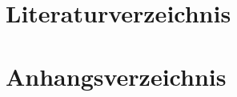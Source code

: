 \documentclass[
pagesize,				%
a4paper,				%
oneside,				%
headsepline,		    %
11pt,					%
halfparskip,		    %
final,					%
listof=totoc           %
]{scrartcl}			    %
\begin{document}




\newpage
\renewcommand{\thesection}{\roman{section}}
\ohead[\pagemark]{}
\setcounter{section}{0}
\newpage
\section{Literaturverzeichnis}
\label{sec:literaturverzeichnis}
\printbibliography
\newpage
\section{Anhangsverzeichnis}
\label{sec:anhangsverzeichnis}
\newpage

\end{document}
